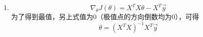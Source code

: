 \begin{enumerate}
	\item 
	\begin{equation}
		\nabla_{\theta}J(\theta) = X^TX\theta - X^T \vec{y}
	\end{equation}
	为了得到最值，另上式值为0（极值点的方向倒数均为0），可得
	\begin{equation}
		\theta = (X^TX)^{-1}X^T\vec{y}
	\end{equation}






\end{enumerate}



























